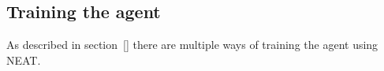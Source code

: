 




%







\subsection{Training the agent}
\label{sub:training-neat}
As described in section~\ref{} there are multiple ways of training the agent using NEAT.

